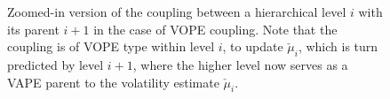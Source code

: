 \begin{figure}
  \centering

  \small

  \newcommand{\w}[1]{\textcolor{white}{#1}}
  \def\svgwidth{0.9\textwidth}


  \caption{Zoomed-in version of the coupling between a hierarchical level $i$ with its parent $i+1$ in the case of \textsf{VOPE} coupling. Note that the coupling is of \textsf{VOPE} type within level $i$, to update $\check{\mu}_i$, which is turn predicted by level $i+1$, where the higher level now serves as a \textsf{VAPE} parent to the volatility estimate $\check{\mu}_i$.}
  \label{\figlabel}
\end{figure}
